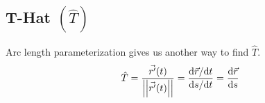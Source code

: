 \subsection{T-Hat $\left(\hat{T}\right)$}
Arc length parameterization gives us another way to find $\hat{T}$.\\
\begin{equation*}
	\hat{T} = \frac{\vec{r^\prime}(t)}{\left|\left|\vec{r^\prime}(t)\right|\right|} = \frac{\mathrm{d}\vec{r}/\mathrm{d}t}{\mathrm{d}s/\mathrm{d}t} = \frac{\mathrm{d}\vec{r}}{\mathrm{d}s}
\end{equation*}